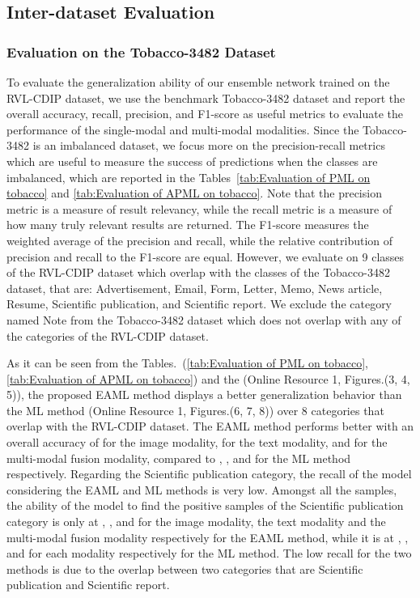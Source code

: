 \documentclass[twocolumn]{svjour3}
\begin{document}
\subsection{Inter-dataset Evaluation}

\subsubsection{Evaluation on the Tobacco-3482 Dataset}
\label{subsubsec:Evaluation on the Tobacco-3482 Dataset}

To evaluate the generalization ability of our ensemble network trained on the RVL-CDIP dataset, we use the benchmark Tobacco-3482 dataset and report the overall accuracy, recall, precision, and F1-score as useful metrics to evaluate the performance of the single-modal and multi-modal modalities. Since the Tobacco-3482 is an imbalanced dataset, we focus more on the precision-recall metrics which are useful to measure the success of predictions when the classes are imbalanced, which are reported in the Tables~\ref{tab:Evaluation of PML on tobacco} and \ref{tab:Evaluation of APML on tobacco}. Note that the precision metric is a measure of result relevancy, while the recall metric is a measure of how many truly relevant results are returned. The F1-score measures the weighted average of the precision and recall, while the relative contribution of precision and recall to the F1-score are equal.                                                                
However, we evaluate on 9 classes of the RVL-CDIP dataset which overlap with the classes of the Tobacco-3482 dataset, that are: Advertisement, Email, Form, Letter, Memo, News article, Resume, Scientific publication, and Scientific report. We exclude the category named Note from the Tobacco-3482 dataset which does not overlap with any of the categories of the RVL-CDIP dataset.

As it can be seen from the Tables.~(\ref{tab:Evaluation of PML on tobacco}, \ref{tab:Evaluation of APML on tobacco}) and the (Online Resource 1, Figures.(3, 4, 5)), the proposed EAML method displays a better generalization behavior than the ML method (Online Resource 1, Figures.(6, 7, 8)) over 8 categories that overlap with the RVL-CDIP dataset. The EAML method performs better with an overall accuracy of  for the image modality,  for the text modality, and  for the multi-modal fusion modality, compared to , , and  for the ML method respectively.
Regarding the Scientific publication category, the recall of the model considering the EAML and ML methods is very low. Amongst all the samples, the ability of the model to find the positive samples of the Scientific publication category is only at , , and  for the image modality, the text modality and the multi-modal fusion modality respectively for the EAML method, while it is at , , and  for each modality respectively for the ML method. The low recall for the two methods is due to the overlap between two categories that are Scientific publication and Scientific report.
\end{document}
